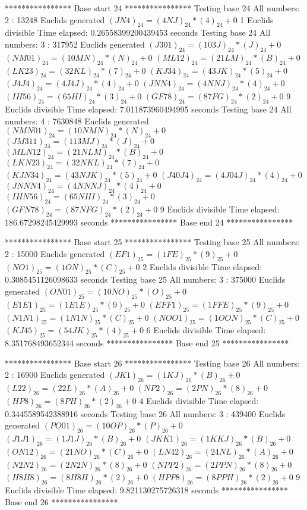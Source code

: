 **************** Base start 24 ****************
Testing base 24 All numbers: 2 :
	 13248 Euclids generated
	$(JN4)_{24}=(4NJ)_{24}*(4)_{24}+0$
	 1 Euclids divisible
Time elapsed: 0.26558399200439453 seconds
Testing base 24 All numbers: 3 :
	 317952 Euclids generated
	$(J301)_{24}=(103J)_{24}*(J)_{24}+0$
	$(NM01)_{24}=(10MN)_{24}*(N)_{24}+0$
	$(ML12)_{24}=(21LM)_{24}*(B)_{24}+0$
	$(LK23)_{24}=(32KL)_{24}*(7)_{24}+0$
	$(KJ34)_{24}=(43JK)_{24}*(5)_{24}+0$
	$(J4J4)_{24}=(4J4J)_{24}*(4)_{24}+0$
	$(JNN4)_{24}=(4NNJ)_{24}*(4)_{24}+0$
	$(IH56)_{24}=(65HI)_{24}*(3)_{24}+0$
	$(GF78)_{24}=(87FG)_{24}*(2)_{24}+0$
	 9 Euclids divisible
Time elapsed: 7.011873960494995 seconds
Testing base 24 All numbers: 4 :
	 7630848 Euclids generated
	$(NMN01)_{24}=(10NMN)_{24}*(N)_{24}+0$
	$(JM311)_{24}=(113MJ)_{24}*(J)_{24}+0$
	$(MLN12)_{24}=(21NLM)_{24}*(B)_{24}+0$
	$(LKN23)_{24}=(32NKL)_{24}*(7)_{24}+0$
	$(KJN34)_{24}=(43NJK)_{24}*(5)_{24}+0$
	$(J40J4)_{24}=(4J04J)_{24}*(4)_{24}+0$
	$(JNNN4)_{24}=(4NNNJ)_{24}*(4)_{24}+0$
	$(IHN56)_{24}=(65NHI)_{24}*(3)_{24}+0$
	$(GFN78)_{24}=(87NFG)_{24}*(2)_{24}+0$
	 9 Euclids divisible
Time elapsed: 186.67298245429993 seconds
**************** Base end 24 ****************

**************** Base start 25 ****************
Testing base 25 All numbers: 2 :
	 15000 Euclids generated
	$(EF1)_{25}=(1FE)_{25}*(9)_{25}+0$
	$(NO1)_{25}=(1ON)_{25}*(C)_{25}+0$
	 2 Euclids divisible
Time elapsed: 0.3085451126098633 seconds
Testing base 25 All numbers: 3 :
	 375000 Euclids generated
	$(ON01)_{25}=(10NO)_{25}*(O)_{25}+0$
	$(E1E1)_{25}=(1E1E)_{25}*(9)_{25}+0$
	$(EFF1)_{25}=(1FFE)_{25}*(9)_{25}+0$
	$(N1N1)_{25}=(1N1N)_{25}*(C)_{25}+0$
	$(NOO1)_{25}=(1OON)_{25}*(C)_{25}+0$
	$(KJ45)_{25}=(54JK)_{25}*(4)_{25}+0$
	 6 Euclids divisible
Time elapsed: 8.351768493652344 seconds
**************** Base end 25 ****************

**************** Base start 26 ****************
Testing base 26 All numbers: 2 :
	 16900 Euclids generated
	$(JK1)_{26}=(1KJ)_{26}*(B)_{26}+0$
	$(L22)_{26}=(22L)_{26}*(A)_{26}+0$
	$(NP2)_{26}=(2PN)_{26}*(8)_{26}+0$
	$(HP8)_{26}=(8PH)_{26}*(2)_{26}+0$
	 4 Euclids divisible
Time elapsed: 0.3445589542388916 seconds
Testing base 26 All numbers: 3 :
	 439400 Euclids generated
	$(PO01)_{26}=(10OP)_{26}*(P)_{26}+0$
	$(J1J1)_{26}=(1J1J)_{26}*(B)_{26}+0$
	$(JKK1)_{26}=(1KKJ)_{26}*(B)_{26}+0$
	$(ON12)_{26}=(21NO)_{26}*(C)_{26}+0$
	$(LN42)_{26}=(24NL)_{26}*(A)_{26}+0$
	$(N2N2)_{26}=(2N2N)_{26}*(8)_{26}+0$
	$(NPP2)_{26}=(2PPN)_{26}*(8)_{26}+0$
	$(H8H8)_{26}=(8H8H)_{26}*(2)_{26}+0$
	$(HPP8)_{26}=(8PPH)_{26}*(2)_{26}+0$
	 9 Euclids divisible
Time elapsed: 9.821130275726318 seconds
**************** Base end 26 ****************

